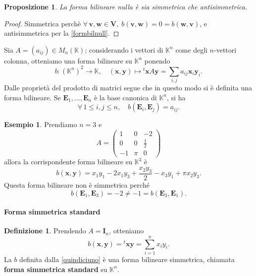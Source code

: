 \documentclass{article}
\theoremstyle{plain}
\newtheorem{prop}[thm]{Proposizione}
\theoremstyle{definition}
\newtheorem{defn}{Definizione}[section]
\newtheorem{exmp}{Esempio}[section]
\theoremstyle{remark}
\begin{document}
\begin{bxthm}
\begin{prop}
La forma bilineare nulla è sia simmetrica che antisimmetrica.    
\end{prop}
\end{bxthm}
\begin{proof}
    Simmetrica perchè $\forall\,\mathbf{v},\mathbf{w}\in\mathbf{V},\;b(\mathbf{v},\mathbf{w})=0=b(\mathbf{w},\mathbf{v})$, e antisimmetrica per la \ref{formbilnull}.
\end{proof}

\vspace{10pt}

Sia $A = (a_{ij}) \in M_n(\mathbb{K})$; considerando i vettori di $\mathbb{K}^n$ come degli $n$-vettori colonna, otteniamo una forma bilineare su $\mathbb{K}^n$ ponendo
\[b:(\mathbb{K}^n)^2\to\mathbb{K},\quad (\mathbf{x},\mathbf{y})\mapsto {}^t\mathbf{x}A\mathbf{y}=\sum_{i,j} a_{ij} \mathbf{x}_i \mathbf{y}_i.\]
Dalle proprietà del prodotto di matrici segue che in questo modo si è definita una forma bilineare. 
Se $\mathbf{E}_1, \ldots, \mathbf{E}_n$ è la base canonica di $\mathbb{K}^n$, si ha
\[
\forall\,1 \leq i, j \leq n,\quad b(\mathbf{E}_i, \mathbf{E}_j) = a_{ij}.
\]

\vspace{10pt}

\begin{exmp}
Prendiamo $n = 3$ e
\[
A = \begin{pmatrix}
1 & 0 & -2 \\
0 & 0 & \frac{1}{2} \\
-1 & \pi & 0
\end{pmatrix}
\]
allora la corrispondente forma bilineare su $\mathbb{K}^3$ è
\[
b(\mathbf{x},\mathbf{y}) = x_1 y_1 - 2 x_1 y_3 + \frac{x_2 y_3}{2} - x_3 y_1 + \pi x_2 y_3.
\]
Questa forma bilineare non è simmetrica perché
\[
b(\mathbf{E}_1, \mathbf{E}_3) = -2 \neq -1 = b(\mathbf{E}_3, \mathbf{E}_1).
\]    
\end{exmp}

\vspace{10pt}

\paragraph{Forma simmetrica standard}
\begin{bxthm}
\begin{defn}
Prendendo $A = \mathbf{I}_n$, otteniamo
\begin{equation}\label{quindiciuno}
    b(\mathbf{x},\mathbf{y}) = {}^t \mathbf{x y} = \sum_{i=1}^{n}x_i y_i.
\end{equation}
La $b$ definita dalla \ref{quindiciuno} è una forma bilineare simmetrica, chiamata \textbf{forma simmetrica standard} su $\mathbb{K}^n$.
\end{defn}
\end{bxthm}
\end{document}
